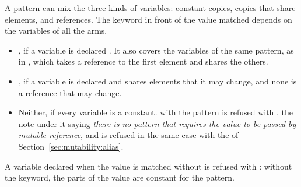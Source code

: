 A pattern can mix the three kinds of variables: constant copies, 
copies that share elements, and  references. The keyword in front
of the value matched depends on the variables of all the arms.

\begin{itemize}
\item {}, if a variable is declared . It also covers the
   variables of the same pattern, as in
  , which takes a reference to the first
  element and shares the others.
\item {}, if a variable is declared  and shares elements
  that it may change, and none is a reference that may change.
\item Neither, if every variable is a constant.  with the
  pattern  is refused with , the note under it saying \textit{there is no pattern that
    requires the value to be passed by mutable reference}, and
   is refused in the same case with the
   of Section~\ref{sec:mutability:alias}.
\end{itemize}

A variable declared  when the value is matched without
 is refused with : without the keyword, the parts of the value are constant for
the pattern.
